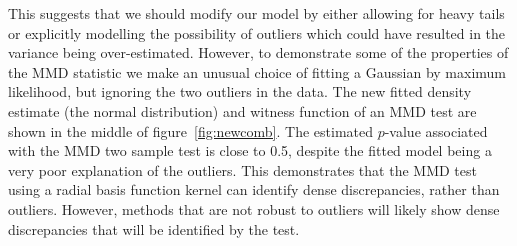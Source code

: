 \documentclass{article} %
\begin{document}
This suggests that we should modify our model by either allowing for heavy tails or explicitly modelling the possibility of outliers which could have resulted in the variance being over-estimated.
However, to demonstrate some of the properties of the MMD statistic we make an unusual choice of fitting a Gaussian by maximum likelihood, but ignoring the two outliers in the data.
The new fitted density estimate (the normal distribution) and witness function of an MMD test are shown in the middle of figure~\ref{fig:newcomb}.
The estimated $p$-value associated with the MMD two sample test is close to 0.5, despite the fitted model being a very poor explanation of the outliers.
This demonstrates that the MMD test using a radial basis function kernel can identify dense discrepancies, rather than outliers.
However, methods that are not robust to outliers will likely show dense discrepancies that will be identified by the test.

%
%
%
%
%
\end{document}
